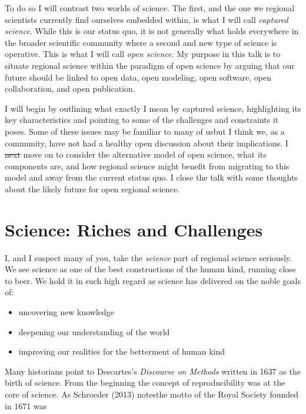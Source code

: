 \documentclass{article}
\providecommand{\DIFadd}[1]{{\protect\color{blue}\uwave{#1}}} %
\providecommand{\DIFdel}[1]{{\protect\color{red}\sout{#1}}}                      %
\providecommand{\DIFaddbegin}{} %
\providecommand{\DIFaddend}{} %
\providecommand{\DIFdelbegin}{} %
\providecommand{\DIFdelend}{} %
\begin{document}
To do so I will contrast two worlds of science. The first, and the one
we regional scientists currently find ourselves embedded within, is what
I will call \emph{captured science}. While this is our status quo, it is
not generally what holds everywhere in the broader scientific community
where a second and new type of science is operative. This is what I will
call \emph{open science}. My purpose in this talk is to situate regional
science within the paradigm of open science by arguing that our future
should be linked to open data, open modeling, open software, open
collaboration, and open publication.

I will begin by outlining what exactly I mean by captured science,
highlighting its key characteristics and pointing to some of the
challenges and constraints it poses. Some of these issues may be
familiar to many of us\DIFaddbegin \DIFadd{, }\DIFaddend but I think we, as a community, have not had a
healthy open discussion about their implications. I \DIFdelbegin \DIFdel{next }\DIFdelend \DIFaddbegin \DIFadd{then }\DIFaddend move on to
consider the alternative model of open science, what its components are,
and how regional science might benefit from migrating to this model and
away from the current status quo. I close the talk with some thoughts
about the likely future for open regional science.

\section{Science: Riches and
Challenges}\label{science-riches-and-challenges}

I, and I suspect many of you, take the \emph{science} part of regional
science seriously. We see science as one of the best constructions of
the human kind, running close to beer. We hold it in such high regard as
science has delivered on the noble goals of:

\begin{itemize}
\itemsep1pt\parskip0pt
\item
  uncovering new knowledge
\item
  deepening our understanding of the world
\item
  improving our realities for the betterment of human kind
\end{itemize}

Many historians point to Descartes's \emph{Discourse on Methods} written
in 1637 as the birth of science. From the beginning the concept of
reproducibility was at the core of science. As Schroeder (2013) notes\DIFaddbegin \DIFadd{,
}\DIFaddend the motto of the Royal Society founded in 1671 was
\end{document}
